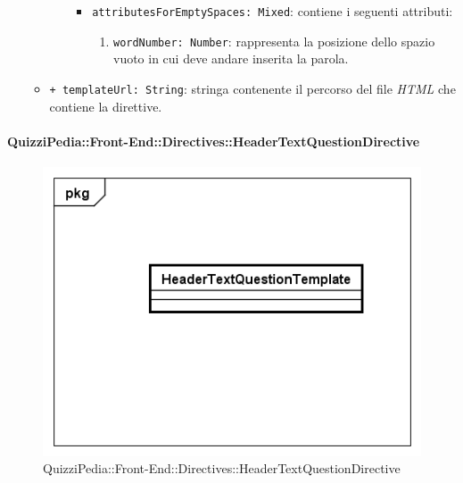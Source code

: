 \begin{itemize}
\begin{itemize}
\begin{itemize}
\begin{itemize}
						\item \texttt{attributesForEmptySpaces: Mixed}: contiene i seguenti attributi:
						\begin{enumerate}
							\item \texttt{wordNumber: Number}: rappresenta la posizione dello spazio vuoto in cui deve andare inserita la parola.
						\end{enumerate}
					\end{itemize}
				\end{itemize}
				\item \texttt{+ templateUrl: String}: stringa contenente il percorso del file \textit{HTML} che contiene la direttive.
			\end{itemize}
		\end{itemize}
		
		\paragraph{QuizziPedia::Front-End::Directives::HeaderTextQuestionDirective}
		
		\label{QuizziPedia::Front-End::Directives::HeaderTextQuestionDirective}
		
		\begin{figure}[ht]
			\centering
			\includegraphics[scale=0.80,keepaspectratio]{UML/Classi/Front-End/QuizziPedia_Front-end_Templates_HeaderTextQuestionTemplate.png}
			\caption{QuizziPedia::Front-End::Directives::HeaderTextQuestionDirective}
		\end{figure} \FloatBarrier
		
